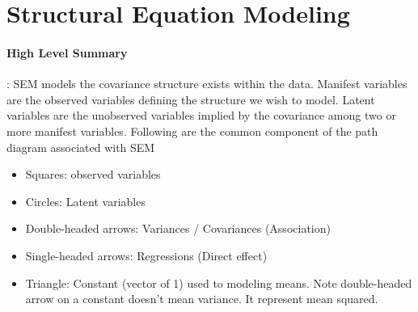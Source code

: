 \section{Structural Equation Modeling}

\paragraph{High Level Summary}: SEM models the covariance structure exists within the data. Manifest variables are the observed variables defining the structure we wish to model. Latent variables are the unobserved variables implied by the covariance among two or more manifest variables. Following are the common component of the path diagram associated with SEM
    \begin{itemize}
        \item Squares: observed variables
        \item Circles: Latent variables
        \item Double-headed arrows: Variances / Covariances (Association)
        \item Single-headed arrows: Regressions (Direct effect) 
        \item Triangle: Constant (vector of 1) used to modeling means. Note double-headed arrow on a constant doesn't mean variance. It represent mean squared. 
    \end{itemize}
    
